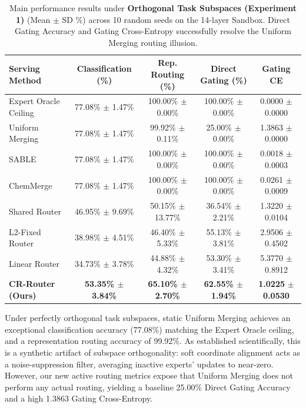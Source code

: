 \begin{table}[t]
\centering
\small
\setlength{\tabcolsep}{2.5pt}
\caption{Main performance results under \textbf{Orthogonal Task Subspaces (Experiment 1)} (Mean $\pm$ SD \%) across 10 random seeds on the 14-layer Sandbox. Direct Gating Accuracy and Gating Cross-Entropy successfully resolve the Uniform Merging routing illusion.}
\vskip 0.15in
\label{tab:orthogonal_results}
\begin{tabular*}{\textwidth}{@{\extracolsep{\fill}}lcccc}
\toprule
\textbf{Serving Method} & \textbf{Classification (\%)} & \textbf{Rep. Routing (\%)} & \textbf{Direct Gating (\%)} & \textbf{Gating CE} \\
\midrule
Expert Oracle Ceiling & 77.08\% $\pm$ 1.47\% & 100.00\% $\pm$ 0.00\% & 100.00\% $\pm$ 0.00\% & 0.0000 $\pm$ 0.0000 \\
Uniform Merging & 77.08\% $\pm$ 1.47\% & 99.92\% $\pm$ 0.11\% & 25.00\% $\pm$ 0.00\% & 1.3863 $\pm$ 0.0000 \\
SABLE \cite{sable2025samplewise} & 77.08\% $\pm$ 1.47\% & 100.00\% $\pm$ 0.00\% & 100.00\% $\pm$ 0.00\% & 0.0018 $\pm$ 0.0003 \\
ChemMerge \cite{chemmerge2025kinetics} & 77.08\% $\pm$ 1.47\% & 100.00\% $\pm$ 0.00\% & 100.00\% $\pm$ 0.00\% & 0.0261 $\pm$ 0.0009 \\
Shared Router & 46.95\% $\pm$ 9.69\% & 50.15\% $\pm$ 13.77\% & 36.54\% $\pm$ 2.21\% & 1.3220 $\pm$ 0.0104 \\
L2-Fixed Router & 38.98\% $\pm$ 4.51\% & 46.40\% $\pm$ 5.33\% & 55.13\% $\pm$ 3.81\% & 2.9506 $\pm$ 0.4502 \\
Linear Router & 34.73\% $\pm$ 3.78\% & 44.88\% $\pm$ 4.32\% & 53.30\% $\pm$ 3.41\% & 5.3770 $\pm$ 0.8912 \\
\midrule
\textbf{CR-Router (Ours)} & \textbf{53.35\% $\pm$ 3.84\%} & \textbf{65.10\% $\pm$ 2.70\%} & \textbf{62.55\% $\pm$ 1.94\%} & \textbf{1.0225} $\pm$ \textbf{0.0530} \\
\bottomrule
\end{tabular*}
\end{table}

Under perfectly orthogonal task subspaces, static Uniform Merging achieves an exceptional classification accuracy (77.08\%) matching the Expert Oracle ceiling, and a representation routing accuracy of 99.92\%. As established scientifically, this is a synthetic artifact of subspace orthogonality: soft coordinate alignment acts as a noise-suppression filter, averaging inactive experts' updates to near-zero. However, our new active routing metrics expose that Uniform Merging does not perform any actual routing, yielding a baseline 25.00\% Direct Gating Accuracy and a high 1.3863 Gating Cross-Entropy.

